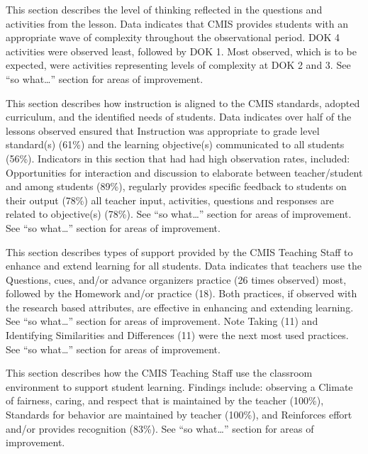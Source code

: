 \documentclass{report}
\begin{document}
\begin{findings}
This section describes the level of thinking reflected in the questions and activities from the lesson. Data indicates that CMIS provides students with an appropriate wave of complexity throughout the observational period. DOK 4 activities were observed least, followed by DOK 1. Most observed, which is to be expected, were activities representing levels of complexity at DOK 2 and 3. See “so what…” section for areas of improvement.


This section describes how instruction is aligned to the CMIS standards, adopted curriculum, and the identified needs of students. Data indicates over half of the lessons observed ensured that Instruction was appropriate to grade level standard(s) (61\%) and the learning objective(s) communicated to all students (56\%).  Indicators in this section that had had high observation rates, included: Opportunities for interaction and discussion to elaborate between teacher/student and among students (89\%), regularly provides specific feedback to students on their output  (78\%) all teacher input, activities, questions and responses are related to objective(s) (78\%). See “so what…” section for areas of improvement. See “so what…” section for areas of improvement.



This section describes types of support provided by the CMIS Teaching Staff to enhance and extend learning for all students. Data indicates that teachers use the Questions, cues, and/or advance organizers practice (26 times observed) most, followed by the Homework and/or practice (18). Both practices, if observed with the research based attributes,  are effective in enhancing and extending learning. See “so what…” section for areas of improvement. Note Taking (11) and Identifying Similarities and Differences (11) were the next most used practices.  See “so what…” section for areas of improvement.
                

This section describes how the CMIS Teaching Staff use the classroom environment to support student learning. Findings include: observing a Climate of fairness, caring, and respect that is maintained by the teacher (100\%), Standards for behavior are maintained by teacher (100\%), and 
Reinforces effort and/or provides recognition (83\%). See “so what…” section for areas of improvement.


\end{findings}
\end{document}
